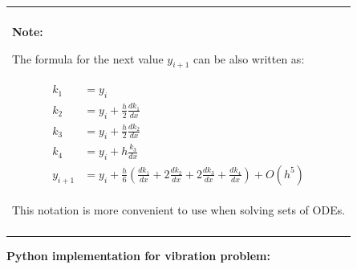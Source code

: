\documentclass[10pt,b5paper,titlepage]{book}
\newenvironment{bbox}[1][1.0]
{
    \begin{center}
        \begin{tabular}{|p{#1\textwidth}|}
            \hline\\
}
{
            \\\\\hline
        \end{tabular}
    \end{center}
}
\newenvironment{ematrix}
{
    \begin{eqnarray}
        \begin{aligned}
}
{
        \end{aligned}
    \end{eqnarray}
}
\begin{document}
\begin{bbox}[0.96]
\textbf{Note:}

The formula for the next value $ y_{i+1} $ can be also written as:

\begin{ematrix}
    k_1 &= y_i\\
    k_2 &= y_i + \frac{h}{2} \frac{d k_1}{dx}\\
    k_3 &= y_i + \frac{h}{2} \frac{d k_2}{dx}\\
    k_4 &= y_i + h \frac{k_3}{dx}\\
    y_{i+1} &= y_i + \frac{h}{6} (\frac{d k_1}{dx} + 2 \frac{d k_2}{dx}
                              + 2 \frac{d k_3}{dx} + \frac{d k_4}{dx}) + O(h^5)
\end{ematrix}

This notation is more convenient to use when solving sets of ODEs.

\end{bbox}

\textbf{Python implementation for vibration problem:}
\end{document}
